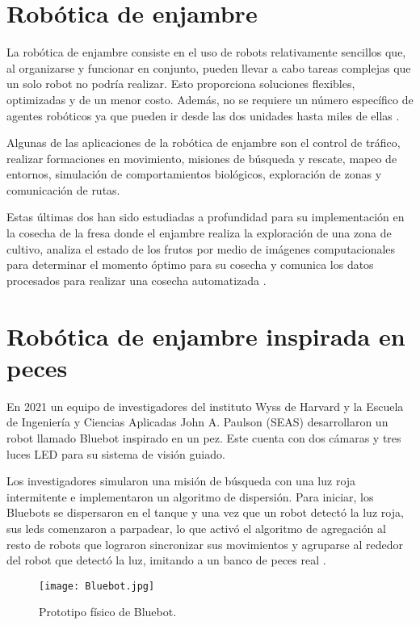 \section{Robótica de enjambre}
La robótica de enjambre consiste en el uso de robots relativamente sencillos que, al organizarse y funcionar en conjunto, pueden llevar a cabo tareas complejas que un solo robot no podría realizar. Esto proporciona soluciones flexibles, optimizadas y de un menor costo. Además, no se requiere un número específico de agentes robóticos ya que pueden ir desde las dos unidades hasta miles de ellas \cite{UNIDIRswarm}.

Algunas de las aplicaciones de la robótica de enjambre son el control de tráfico, realizar formaciones en movimiento, misiones de búsqueda y rescate, mapeo de entornos, simulación de comportamientos biológicos, exploración de zonas y comunicación de rutas. 

Estas últimas dos han sido estudiadas a profundidad para su implementación en la cosecha de la fresa donde el enjambre realiza la exploración de una zona de cultivo, analiza el estado de los frutos por medio de imágenes computacionales para determinar el momento óptimo para su cosecha y comunica los datos procesados para realizar una cosecha automatizada \cite{EnjambresCultivos}.

\section{Robótica de enjambre inspirada en peces}
En 2021 un equipo de investigadores del instituto Wyss de Harvard y la Escuela de Ingeniería y Ciencias Aplicadas John A. Paulson (SEAS) desarrollaron un robot llamado Bluebot inspirado en un pez. Este cuenta con dos cámaras y tres luces LED para su sistema de visión guiado. 

Los investigadores simularon una misión de búsqueda con una luz roja intermitente e implementaron un algoritmo de dispersión. Para iniciar, los Bluebots se dispersaron en el tanque y una vez que un robot detectó la luz roja, sus leds comenzaron a parpadear, lo que activó el algoritmo de agregación al resto de robots que lograron sincronizar sus movimientos y agruparse al rededor del robot que detectó la luz, imitando a un banco de peces real \cite{Bluebot}.

\begin{figure}[H]
	\centering
	\texttt{[image: Bluebot.jpg]}
	\caption{Prototipo físico de Bluebot\cite{Bluebot}.}
	\label{fig:bluebot}
\end{figure}

